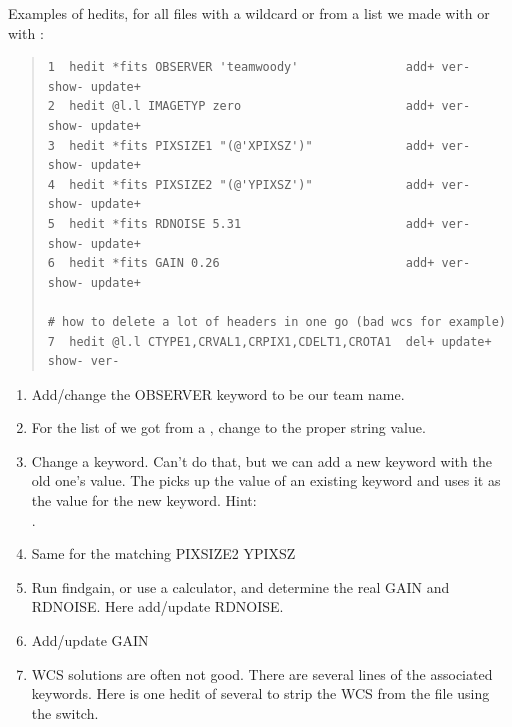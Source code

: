 Examples of hedits, for all files with a wildcard {\color{verbcolor}{\verb#*fits#}}
or from a list we made with {\color{verbcolor}{\verb#files#}} or with
{\color{verbcolor}{\verb#hselect#}}:

\begin{quote}
\begingroup \fontsize{8pt}{8pt}
\selectfont
\begin{verbatim}
1  hedit *fits OBSERVER 'teamwoody'               add+ ver- show- update+
2  hedit @l.l IMAGETYP zero                       add+ ver- show- update+
3  hedit *fits PIXSIZE1 "(@'XPIXSZ')"             add+ ver- show- update+
4  hedit *fits PIXSIZE2 "(@'YPIXSZ')"             add+ ver- show- update+
5  hedit *fits RDNOISE 5.31                       add+ ver- show- update+
6  hedit *fits GAIN 0.26                          add+ ver- show- update+

# how to delete a lot of headers in one go (bad wcs for example)
7  hedit @l.l CTYPE1,CRVAL1,CRPIX1,CDELT1,CROTA1  del+ update+ show- ver-
\end{verbatim}
\endgroup
\end{quote}

\vspace{-.15cm}
\begin{enumerate}[resume]\addtolength{\itemsep}{-0.5\baselineskip}
   \item   Add/change the OBSERVER keyword to be our team name.
   \item   For the list of {\color{verbcolor}{\verb#IMAGETYP ?= 'Bias'#}} we
got from a {\color{verbcolor}{\verb#hselect#}}, change to the proper
{\color{verbcolor}{\verb#zero#}} string value.
   \item Change a keyword. Can't do that, but we can add a new keyword
     with the old one's value. The
     {\color{verbcolor}{\verb#"(@'XPIXSZ')"#}} picks up the value of
     an existing {\color{verbcolor}{\verb#XPIXSZ#}} keyword and uses
     it as the value for the new keyword. Hint:\\
     {\color{verbcolor}{\verb#hedit @l.l XPIXSIZ del+ update+ show- ver-#}}.
   \item   Same for the matching PIXSIZE2 \menu YPIXSZ
   \item Run findgain, or use a calculator, and determine the real
     GAIN and RDNOISE. Here add/update RDNOISE.
   \item   Add/update GAIN
   \item WCS solutions are often not good. There are several lines of
     the associated keywords. Here is one hedit of several to strip
     the WCS from the file using the
     {\color{verbcolor}{\verb#delete#}} switch.
\end{enumerate}


